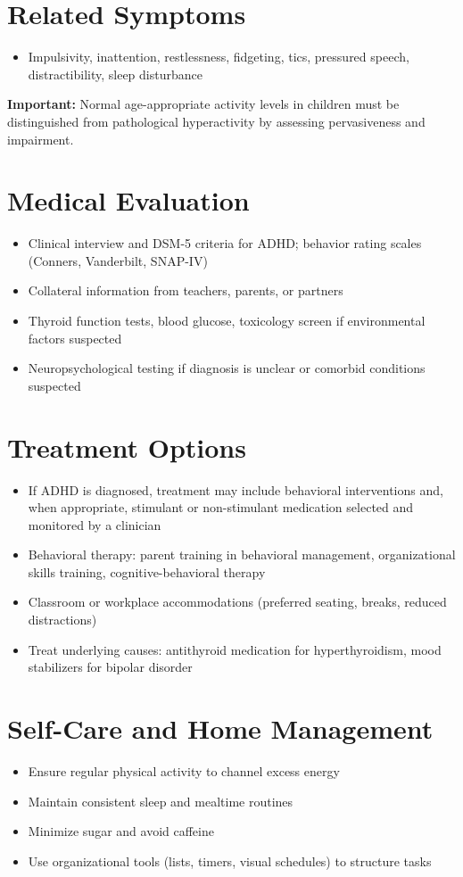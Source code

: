 \section*{Related Symptoms}
\begin{itemize}
  \item Impulsivity, inattention, restlessness, fidgeting, tics, pressured speech, distractibility, sleep disturbance
\end{itemize}
\textbf{Important:} Normal age-appropriate activity levels in children must be distinguished from pathological hyperactivity by assessing pervasiveness and impairment.

\section*{Medical Evaluation}
\begin{itemize}
  \item Clinical interview and DSM-5 criteria for ADHD; behavior rating scales (Conners, Vanderbilt, SNAP-IV)
  \item Collateral information from teachers, parents, or partners
  \item Thyroid function tests, blood glucose, toxicology screen if environmental factors suspected
  \item Neuropsychological testing if diagnosis is unclear or comorbid conditions suspected
\end{itemize}

\section*{Treatment Options}
\begin{itemize}
  \item If ADHD is diagnosed, treatment may include behavioral interventions and, when appropriate, stimulant or non-stimulant medication selected and monitored by a clinician
  \item Behavioral therapy: parent training in behavioral management, organizational skills training, cognitive-behavioral therapy
  \item Classroom or workplace accommodations (preferred seating, breaks, reduced distractions)
  \item Treat underlying causes: antithyroid medication for hyperthyroidism, mood stabilizers for bipolar disorder
\end{itemize}

\section*{Self-Care and Home Management}
\begin{itemize}
  \item Ensure regular physical activity to channel excess energy
  \item Maintain consistent sleep and mealtime routines
  \item Minimize sugar and avoid caffeine
  \item Use organizational tools (lists, timers, visual schedules) to structure tasks
\end{itemize}

